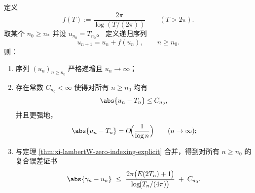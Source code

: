 \begin{proposition}[平均间距递归轨迹与误差可控的累积稳定性]\label{prop:xi-lambertW-recursive-trajectory-stability}
定义
\[
f(T):=\frac{2\pi}{\log(T/(2\pi))}\qquad(T>2\pi).
\]
取某个 \(n_0\ge n_\ast\) 并设 \(u_{n_0}=T_{n_0}\)。
定义递归序列
\begin{equation}\label{eq:xi-lambertW-un-recursion}
u_{n+1}=u_n+f(u_n),\qquad n\ge n_0.
\end{equation}
则：
\begin{enumerate}
  \item 序列 \((u_n)_{n\ge n_0}\) 严格递增且 \(u_n\to\infty\)；
  \item 存在常数 \(C_{n_0}<\infty\) 使得对所有 \(n\ge n_0\) 均有
  \begin{equation}\label{eq:xi-lambertW-un-Tn-uniform}
  \abs{u_n-T_n}\le C_{n_0},
  \end{equation}
  并且更强地，
  \begin{equation}\label{eq:xi-lambertW-un-Tn-rate}
  \abs{u_n-T_n}=O\!\Bigl(\frac{1}{\log n}\Bigr)\qquad(n\to\infty);
  \end{equation}
  \item 与定理 \ref{thm:xi-lambertW-zero-indexing-explicit} 合并，得到对所有 \(n\ge n_0\) 的复合误差证书
  \begin{equation}\label{eq:xi-lambertW-gamman-un-composite}
  \abs{\gamma_n-u_n}
  \ \le\
  \frac{2\pi\bigl(E(2T_n)+1\bigr)}{\log\!\bigl(T_n/(4\pi)\bigr)}
  \;+\;C_{n_0}.
  \end{equation}
\end{enumerate}
\end{proposition}
